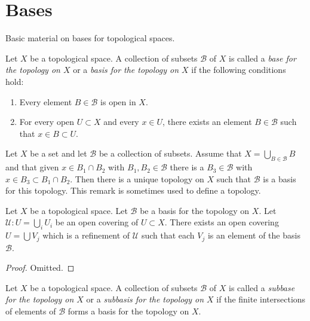 \section{Bases}
\label{section-bases}

\noindent
Basic material on bases for topological spaces.

\begin{definition}
\label{definition-base}
Let $X$ be a topological space. A collection of subsets $\mathcal{B}$ of $X$
is called a {\it base for the topology on $X$} or a {\it basis for the
topology on $X$} if the following conditions hold:
\begin{enumerate}
\item Every element $B \in \mathcal{B}$ is open in $X$.
\item For every open $U \subset X$ and every $x \in U$,
there exists an element $B \in \mathcal{B}$ such that
$x \in B \subset U$.
\end{enumerate}
\end{definition}

\noindent
Let $X$ be a set and let $\mathcal{B}$ be a collection of subsets.
Assume that $X = \bigcup_{B \in \mathcal{B}} B$ and that given
$x \in B_1 \cap B_2$ with $B_1, B_2 \in \mathcal{B}$ there is a
$B_3 \in \mathcal{B}$ with $x \in B_3 \subset B_1 \cap B_2$.
Then there is a unique topology on $X$ such that $\mathcal{B}$
is a basis for this topology. This remark is sometimes used
to define a topology.

\begin{lemma}
\label{lemma-refine-covering-basis}
Let $X$ be a topological space.
Let $\mathcal{B}$ be a basis for the topology on $X$.
Let $\mathcal{U} : U = \bigcup_i U_i$ be an open covering of
$U \subset X$. There exists an open covering $U = \bigcup V_j$
which is a refinement of $\mathcal{U}$ such that each
$V_j$ is an element of the basis $\mathcal{B}$.
\end{lemma}

\begin{proof}
Omitted.
\end{proof}

\begin{definition}
\label{definition-subbase}
Let $X$ be a topological space. A collection of subsets $\mathcal{B}$ of $X$
is called a {\it subbase for the topology on $X$} or a {\it subbasis for the
topology on $X$} if the finite intersections of
elements of $\mathcal{B}$ forms a basis for the topology on $X$.
\end{definition}

